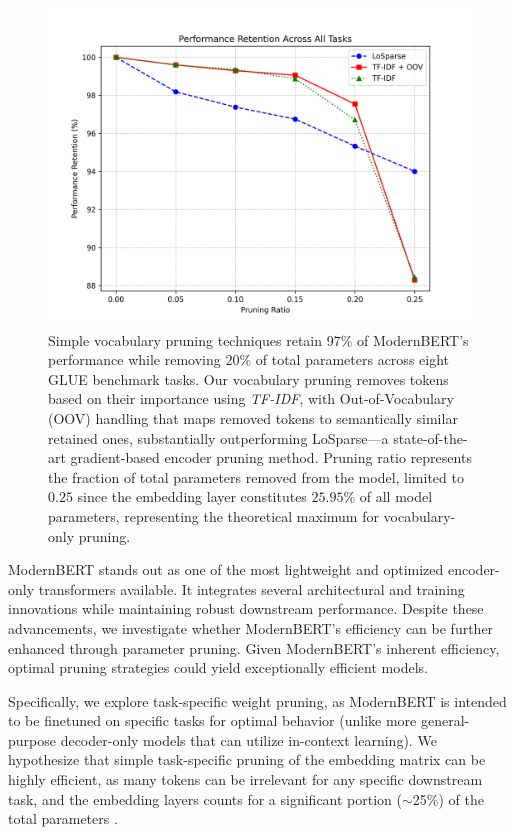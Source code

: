 \documentclass[twocolumn]{article}
\begin{document}
\begin{figure}[t]
\centering
\includegraphics[width=\columnwidth]{images/performance_retention.png}
\caption{Simple vocabulary pruning techniques retain \raisebox{0.2ex}{\scalebox{0.8}{$>$}}97\% of ModernBERT's performance while removing $20\%$ of total parameters across eight GLUE benchmark tasks. Our vocabulary pruning removes tokens based on their importance using \textit{TF-IDF}, with Out-of-Vocabulary (OOV) handling that maps removed tokens to semantically similar retained ones, substantially outperforming LoSparse---a state-of-the-art gradient-based encoder pruning method. Pruning ratio represents the fraction of total parameters removed from the model, limited to $0.25$ since the embedding layer constitutes $25.95\%$ of all model parameters, representing the theoretical maximum for vocabulary-only pruning.}
\label{fig:pruning_retention}
\end{figure}

ModernBERT \cite{warner2024modernbert} stands out as one of the most lightweight and optimized encoder-only transformers available. It integrates several architectural and training innovations while maintaining robust downstream performance. Despite these advancements, we investigate whether ModernBERT's efficiency can be further enhanced through parameter pruning. Given ModernBERT's inherent efficiency, optimal pruning strategies could yield exceptionally efficient models.

Specifically, we explore task-specific weight pruning, as ModernBERT is intended to be finetuned on specific tasks for optimal behavior (unlike more general-purpose decoder-only models that can utilize in-context learning). We hypothesize that simple task-specific pruning of the embedding matrix can be highly efficient, as many tokens can be irrelevant for any specific downstream task, and the embedding layers counts for a significant portion ($\sim$25\%) of the total parameters \cite{yang2022taskspecific}.
\end{document}
